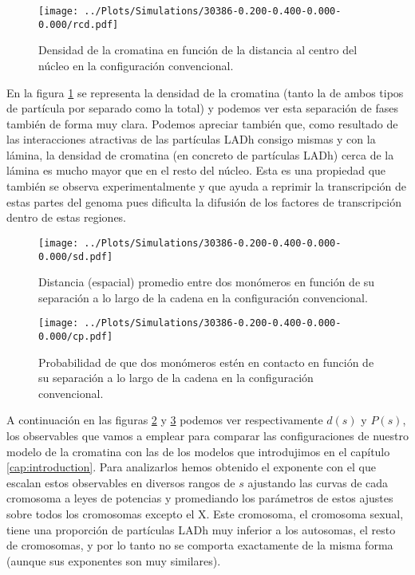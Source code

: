 \begin{figure}[t]
    \centering
    \texttt{[image: ../Plots/Simulations/30386-0.200-0.400-0.000-0.000/rcd.pdf]}
    \caption{Densidad de la cromatina en función de la distancia al centro del núcleo en la configuración convencional.}
    \label{fig:rcd_c}
\end{figure}

En la figura \ref{fig:rcd_c} se representa la densidad de la cromatina (tanto la de ambos tipos de partícula por separado como la total) y podemos ver esta separación de fases también de forma muy clara. Podemos apreciar también que, como resultado de las interacciones atractivas de las partículas LADh consigo mismas y con la lámina, la densidad de cromatina (en concreto de partículas LADh) cerca de la lámina es mucho mayor que en el resto del núcleo. Esta es una propiedad que también se observa experimentalmente y que ayuda a reprimir la transcripción de estas partes del genoma pues dificulta la difusión de los factores de transcripción dentro de estas regiones.

\begin{figure}[p]
    \centering
    \texttt{[image: ../Plots/Simulations/30386-0.200-0.400-0.000-0.000/sd.pdf]}
    \caption{Distancia (espacial) promedio entre dos monómeros en función de su separación a lo largo de la cadena en la configuración convencional.}
    \label{fig:sd_c}
\end{figure}

\begin{figure}[p]
    \centering
    \texttt{[image: ../Plots/Simulations/30386-0.200-0.400-0.000-0.000/cp.pdf]}
    \caption{Probabilidad de que dos monómeros estén en contacto en función de su separación a lo largo de la cadena en la configuración convencional.}
    \label{fig:cp_c}
\end{figure}

A continuación en las figuras \ref{fig:sd_c} y \ref{fig:cp_c} podemos ver respectivamente $d(s)$ y $P(s)$, los observables que vamos a emplear para comparar las configuraciones de nuestro modelo de la cromatina con las de los modelos que introdujimos en el capítulo \ref{cap:introduction}. Para analizarlos hemos obtenido el exponente con el que escalan estos observables en diversos rangos de $s$ ajustando las curvas de cada cromosoma a leyes de potencias y promediando los parámetros de estos ajustes sobre todos los cromosomas excepto el X. Este cromosoma, el cromosoma sexual, tiene una proporción de partículas LADh muy inferior a los autosomas, el resto de cromosomas, y por lo tanto no se comporta exactamente de la misma forma (aunque sus exponentes son muy similares).


